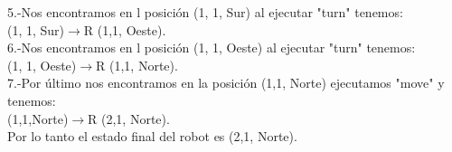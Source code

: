 \documentclass{article}
\begin{document}
\begin{itemize}
            5.-Nos encontramos en l posición (1, 1, Sur) al ejecutar "turn" tenemos:\\
            (1, 1, Sur)$\rightarrow$R (1,1, Oeste).\\

            6.-Nos encontramos en l posición (1, 1, Oeste) al ejecutar "turn" tenemos:\\
            (1, 1, Oeste)$\rightarrow$R (1,1, Norte).\\

            7.-Por último nos encontramos en la posición (1,1, Norte) ejecutamos "move" y tenemos:\\
            (1,1,Norte)$\rightarrow$R (2,1, Norte).\\

            Por lo tanto el estado final del robot es (2,1, Norte).\\
    \end{itemize}
\end{document}
